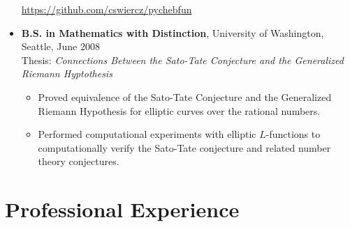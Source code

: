 \documentclass{article}
\begin{document}
\begin{itemize}
\begin{itemize*}
      \url{https://github.com/cswiercz/pychebfun}
    \end{itemize*}
  \item {\bf B.S. in Mathematics with Distinction}, University of Washington,
    Seattle, June 2008 \\ Thesis: {\it Connections Between the Sato-Tate
      Conjecture and the Generalized Riemann
      Hyptothesis} %
   \begin{itemize}
   \item Proved equivalence of the Sato-Tate Conjecture and the Generalized
     Riemann Hypothesis for elliptic curves over the rational numbers.
   \item Performed computational experiments with elliptic $L$-functions to
     computationally verify the Sato-Tate conjecture and related number theory
     conjectures.
   \end{itemize}
\end{itemize}


\section*{Professional Experience}
\end{document}
